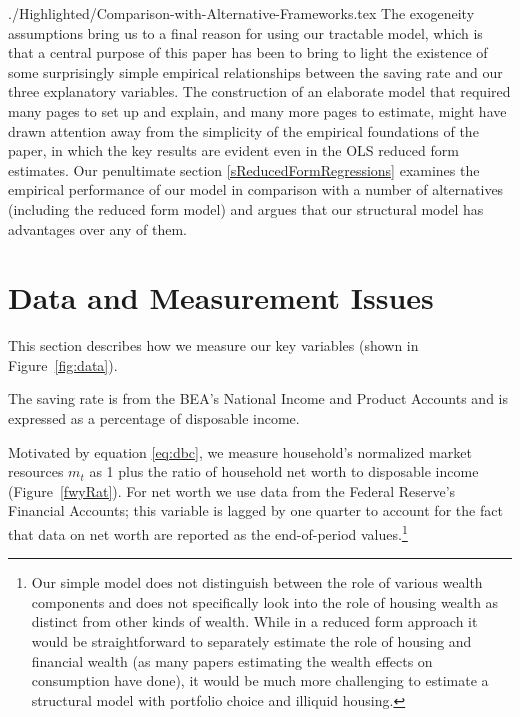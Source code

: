 \documentclass[titlepage]{\econtex}
\begin{document}
\begin{verbatimwrite}{./Highlighted/Comparison-with-Alternative-Frameworks.tex}
The exogeneity assumptions bring us to a final reason for using our tractable model, which is that a central purpose of this paper has been to bring to light the existence of some surprisingly simple empirical relationships between the saving rate and our three explanatory variables.  The construction of an elaborate model that required many pages to set up and explain, and many more pages to estimate, might have drawn attention away from the simplicity of the empirical foundations of the paper, in which the key results are evident even in the OLS reduced form estimates.  Our penultimate section \ref{sReducedFormRegressions} examines the empirical performance of our model in comparison with a number of alternatives (including the reduced form model) and argues that our structural model has advantages over any of them.
\end{verbatimwrite}


\section{Data and Measurement Issues} \label{DataAndMeasurement} \hypertarget{DataAndMeasurement}{}

This section describes how we measure our key variables (shown in Figure~\ref{fig:data}).

The saving rate is from the BEA's National Income and Product Accounts and is expressed as a percentage of disposable income.

Motivated by equation \eqref{eq:dbc}, we measure household's normalized market resources $m_t$ as 1 plus the ratio of household net worth to disposable income (Figure~\ref{fwyRat}). For net worth we use data from the Federal Reserve's Financial Accounts; this variable is lagged by one quarter to account for the fact that data on net worth are reported as the end-of-period values.\footnote{Our simple model does not distinguish between the role of various wealth components and does not specifically look into the role of housing wealth as distinct from other kinds of wealth. While in a reduced form approach it would be straightforward to separately estimate the role of housing and financial wealth (as many papers estimating the wealth effects on consumption have done), it would be much more challenging to estimate a structural model with portfolio choice and illiquid housing.}
\end{document}
